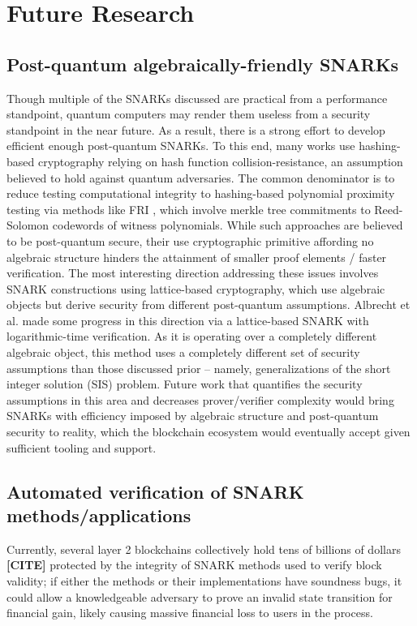 \section{Future Research}

\subsection{Post-quantum algebraically-friendly SNARKs}
\noindent Though multiple of the SNARKs discussed are practical from a performance standpoint, quantum computers may render them useless from a security standpoint in the near future. As a result, there is a strong effort to develop efficient enough post-quantum SNARKs. To this end, many works \cite{starks, ligero, fractal, spartan} use hashing-based cryptography relying on hash function collision-resistance, an assumption believed to hold against quantum adversaries. The common denominator is to reduce testing computational integrity to hashing-based polynomial proximity testing via methods like FRI \cite{FRI}, which involve merkle tree commitments to Reed-Solomon codewords of witness polynomials. While such approaches are believed to be post-quantum secure, their use cryptographic primitive affording no algebraic structure hinders the attainment of smaller proof elements / faster verification. The most interesting direction addressing these issues involves SNARK constructions using lattice-based cryptography, which use algebraic objects but derive security from different post-quantum assumptions. Albrecht et al. \cite{lattice1} made some progress in this direction via a lattice-based SNARK with logarithmic-time verification. As it is operating over a completely different algebraic object, this method uses a completely different set of security assumptions than those discussed prior -- namely, generalizations of the short integer solution (SIS) problem. Future work that quantifies the security assumptions in this area and decreases prover/verifier complexity would bring SNARKs with efficiency imposed by algebraic structure and post-quantum security to reality, which the blockchain ecosystem would eventually accept given sufficient tooling and support.

\subsection{Automated verification of SNARK methods/applications}
\noindent Currently, several layer 2 blockchains collectively hold tens of billions of dollars \textbf{[CITE]} protected by the integrity of SNARK methods used to verify block validity; if either the methods or their implementations have soundness bugs, it could allow a knowledgeable adversary to prove an invalid state transition for financial gain, likely causing massive financial loss to users in the process. \\

